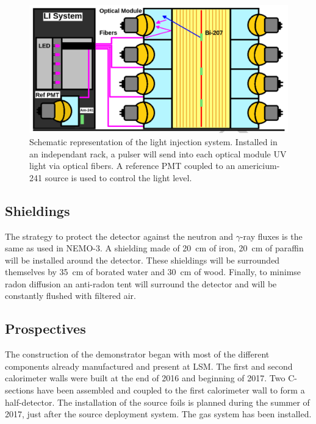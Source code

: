 \documentclass[main.tex]{subfiles}
\begin{document}
\bigskip
\begin{figure}[h!]
\begin{center}
\includegraphics[scale=0.3]{pictures/Chap3/LIschema.png}
\caption{Schematic representation of the light injection system. Installed in an independant rack, a pulser will send into each optical module UV light via optical fibers. A reference PMT coupled to an americium-241 source is used to control the light level.}
\label{LIschema}
\end{center}
\end{figure}


\subsection{Shieldings}


\NI The strategy to protect the detector against the neutron and $\gamma$-ray fluxes is the same as used in NEMO-3. A shielding made of 20~cm of iron, 20~cm of paraffin will be installed around the detector. These shieldings will be surrounded themselves by 35~cm of borated water and 30~cm of wood. Finally, to minimse radon diffusion an anti-radon tent will surround the detector and will be constantly flushed with filtered air.


\subsection{Prospectives}


\NI The construction of the demonstrator began with most of the different components already manufactured and present at LSM. The first and second calorimeter walls were built at the end of 2016 and beginning of 2017. Two C-sections have been assembled and coupled to the first calorimeter wall to form a half-detector. The installation of the source foils is planned during the summer of 2017, just after the source deployment system. The gas system has been installed.
\end{document}

